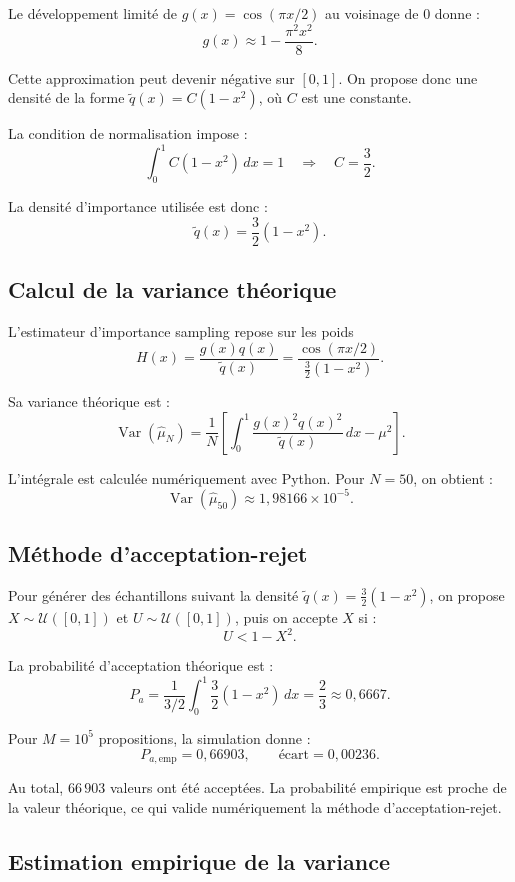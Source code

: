 \documentclass[12pt,a4paper]{article}
\begin{document}
Le développement limité de $g(x)=\cos(\pi x/2)$ au voisinage
de $0$ donne :
\[
g(x)\approx 1-\frac{\pi^2x^2}{8}.
\]

Cette approximation peut devenir négative sur $[0,1]$.
On propose donc une densité de la forme
$\widetilde q(x)=C(1-x^2)$, où $C$ est une constante.

La condition de normalisation impose :
\[
\int_0^1 C(1-x^2)\,dx=1
\quad\Longrightarrow\quad C=\frac32.
\]

La densité d'importance utilisée est donc :
\[
\boxed{\widetilde q(x)=\frac32(1-x^2).}
\]

\subsection{Calcul de la variance théorique}

L'estimateur d'importance sampling repose sur les poids
\[
H(x)=\frac{g(x)q(x)}{\widetilde q(x)}
=\frac{\cos(\pi x/2)}{\frac32(1-x^2)}.
\]

Sa variance théorique est :
\[
\operatorname{Var}(\widehat{\mu}_N)
=\frac{1}{N}
\left[
\int_0^1\frac{g(x)^2q(x)^2}{\widetilde q(x)}\,dx
-\mu^2
\right].
\]

L'intégrale est calculée numériquement avec Python.
Pour $N=50$, on obtient :
\[
\boxed{
\operatorname{Var}(\widehat{\mu}_{50})
\approx 1{,}98166\times10^{-5}.
}
\]


\subsection{Méthode d'acceptation-rejet}

Pour générer des échantillons suivant la densité
$\widetilde q(x)=\frac32(1-x^2)$, on propose
$X\sim\mathcal U([0,1])$ et $U\sim\mathcal U([0,1])$,
puis on accepte $X$ si :
\[
U<1-X^2.
\]

La probabilité d'acceptation théorique est :
\[
P_a=\frac{1}{3/2}\int_0^1
\frac32(1-x^2)\,dx
=\boxed{\frac23\approx 0{,}6667}.
\]

Pour $M=10^5$ propositions, la simulation donne :
\[
P_{a,\mathrm{emp}}=0{,}66903,
\qquad
\text{écart}=0{,}00236.
\]

Au total, $66\,903$ valeurs ont été acceptées.
La probabilité empirique est proche de la valeur théorique,
ce qui valide numériquement la méthode d'acceptation-rejet.

\subsection{Estimation empirique de la variance}
\end{document}
